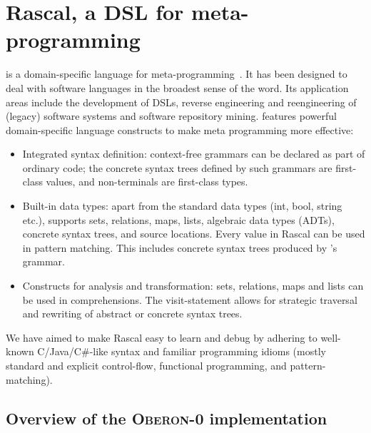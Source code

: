 \section{Rascal, a DSL for meta-programming}

\def\oberon{\textsc{Oberon-0}\xspace}

\def\rcode#1{\texttt{#1}}


\noindent \Rascal is a domain-specific language for
meta-programming~\cite{rascal,RascalLWC11}. It has been designed to deal with software languages
in the broadest sense of the word. Its application areas include the
development of DSLs, reverse engineering and reengineering of (legacy)
software systems and software repository mining. \Rascal features
powerful domain-specific language constructs to make meta programming
more effective:
\begin{itemize}
\item Integrated syntax definition: context-free grammars can be
  declared as part of ordinary \Rascal code; the concrete syntax trees defined
  by such grammars are first-class values, and non-terminals are
  first-class types.
\item Built-in data types: apart from the standard data types (int,
  bool, string etc.), \Rascal supports sets, relations, maps, lists,
  algebraic data types (ADTs), concrete syntax trees, and source
  locations. Every value in Rascal can be used in pattern
  matching. This includes concrete syntax trees produced by \Rascal's
  grammar.
\item Constructs for analysis and transformation: sets, relations,
  maps and lists can be used in comprehensions. The visit-statement
  allows for strategic traversal and rewriting of abstract or
  concrete syntax trees.
\end{itemize}
We have aimed to make Rascal easy to learn and debug by adhering to well-known C/Java/C\#-like syntax and familiar programming idioms (mostly standard and explicit control-flow, functional programming, and pattern-matching).

\subsection{Overview of the \Rascal \oberon implementation}

